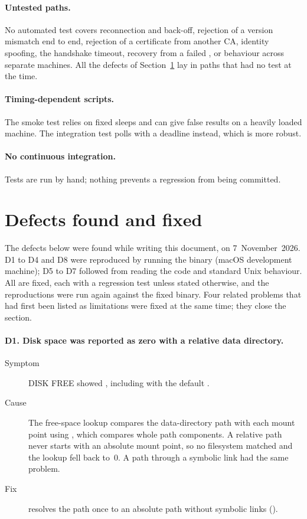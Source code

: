 \documentclass{article}
\begin{document}
\paragraph{Untested paths.}
No automated test covers reconnection and back-off, rejection of a
version mismatch end to end, rejection of a certificate from another CA,
identity spoofing, the handshake timeout, recovery from a failed
, or behaviour across separate machines. All the defects of
Section~\ref{sec:defects} lay in paths that had no test at the time.

\paragraph{Timing-dependent scripts.}
The smoke test relies on fixed sleeps and can give false results on a
heavily loaded machine. The integration test polls with a deadline
instead, which is more robust.

\paragraph{No continuous integration.}
Tests are run by hand; nothing prevents a regression from being
committed.

\section{Defects found and fixed}
\label{sec:defects}

The defects below were found while writing this document, on
7~November~2026. D1 to D4 and D8 were reproduced by running the binary
(macOS development machine); D5 to D7 followed from reading the code and
standard Unix behaviour. All are fixed, each with a regression test unless
stated otherwise, and the reproductions were run again against the fixed
binary. Four related problems that had first been listed as limitations
were fixed at the same time; they close the section.

\paragraph{D1. Disk space was reported as zero with a relative data directory.}
\begin{description}
  \item[Symptom] DISK FREE showed , including with the default
    .
  \item[Cause] The free-space lookup compares the data-directory path with
    each mount point using , which compares whole
    path components. A relative path never starts with an absolute mount
    point, so no filesystem matched and the lookup fell back to~0. A path
    through a symbolic link had the same problem.
  \item[Fix]  resolves the path once to an
    absolute path without symbolic links ().
\end{description}
\end{document}
